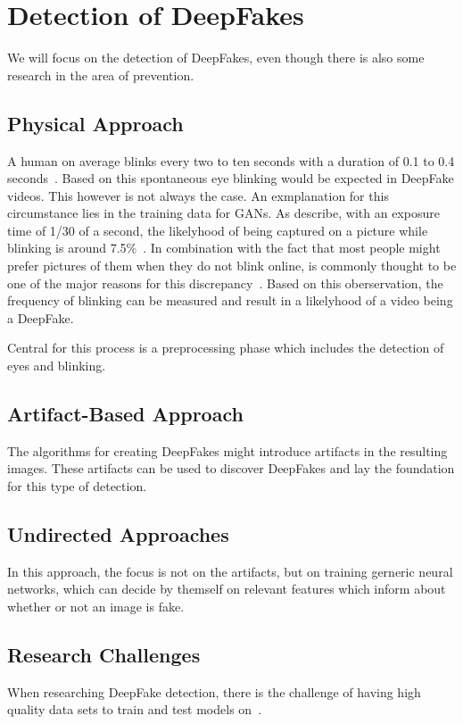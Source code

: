 \section{Detection of DeepFakes}
We will focus on the detection of DeepFakes, even though there is also some research in the area of
prevention.

\subsection{Physical Approach}
A human on average blinks every two to ten seconds with a duration of 0.1 to 0.4 seconds~\cite{li_ictu_2018}.
Based on this spontaneous eye blinking would be expected in DeepFake videos.
This however is not always the case.
An exmplanation for this circumstance lies in the training data for GANs.
As \textcite{li_ictu_2018} describe, with an exposure time of 1/30 of a second,
the likelyhood of being captured on a picture while blinking is around 7.5\%~\cite{li_ictu_2018}.
In combination with the fact that most people might prefer pictures of them when they do not blink online,
is commonly thought to be one of the major reasons for this discrepancy~\cite{pishori_detecting_2020}.
Based on this oberservation, the frequency of blinking can be measured and result in a likelyhood of
a video being a DeepFake.

Central for this process is a preprocessing phase which includes the detection of eyes and blinking.



\subsection{Artifact-Based Approach}
The algorithms for creating DeepFakes might introduce artifacts in the resulting images.
These artifacts can be used to discover DeepFakes and lay the foundation for this type of detection.

\subsection{Undirected Approaches}
In this approach, the focus is not on the artifacts, but on training gerneric neural networks, which can decide by themself on relevant
features which inform about whether or not an image is fake.

\subsection{Research Challenges}
When researching DeepFake detection, there is the challenge of having high quality data sets to train and test models on~\cite{li_celeb-df_2019}.

